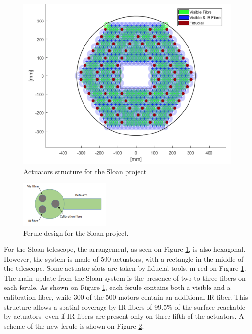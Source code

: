 \begin{figure}[h]
\begin{center}
	\includegraphics[width=\textwidth]{reminder/sloan_arrangement.png}
	\caption{Actuators structure for the Sloan project.}
	\label{fig:reminder:sloan_arrangement}
\end{center}
\end{figure}

\begin{figure}[h]
\begin{center}
	\includegraphics[width=0.40\textwidth]{reminder/ferule.png}
	\caption{Ferule design for the Sloan project.}
	\label{fig:reminder:ferule}
\end{center}
\end{figure}


For the Sloan telescope, the arrangement, as seen on Figure \ref{fig:reminder:sloan_arrangement}, is also hexagonal. However, the system is made of 500 actuators, with a rectangle in the middle of the telescope. Some actuator slots are taken by fiducial tools, in red on Figure \ref{fig:reminder:sloan_arrangement}.\\

The main update from the Sloan system is the presence of two to three fibers on each ferule. As shown on Figure \ref{fig:reminder:sloan_arrangement}, each ferule contains both a visible and a calibration fiber, while 300 of the 500 motors contain an additional IR fiber. This structure allows a spatial coverage by IR fibers of 99.5\% of the surface reachable by actuators, even if IR fibers are present only on three fifth of the actuators. A scheme of the new ferule is shown on Figure \ref{fig:reminder:ferule}.

